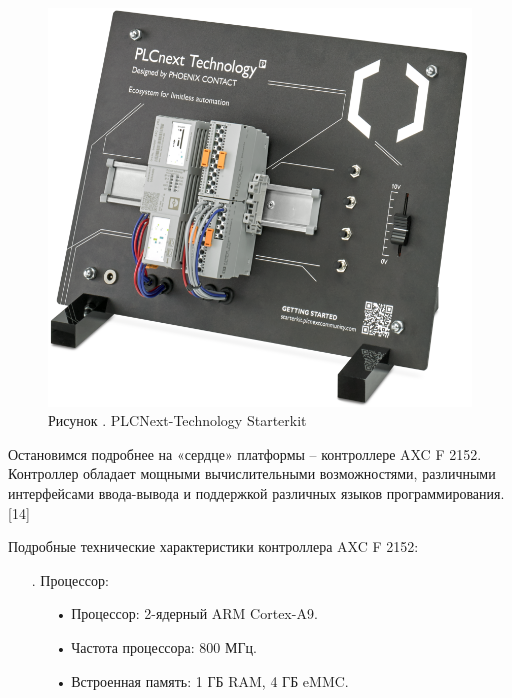 {	\begin{figure}[H]
		\centering
		\def\svgwidth{\textwidth}
		\includegraphics[scale=0.7]{images/pclnext_x.png}
		\caption*{\gostFont Рисунок \thechaptercntr .\theimagecntr \spc {--} PLCNext-Technology Starterkit}
		\label{fig:ACXF2152}
	\end{figure}  \addtocounter{imagecntr}{1}

	\par \redline Остановимся подробнее на «сердце» платформы {--} контроллере AXC F 2152. Контроллер обладает мощными вычислительными возможностями, различными интерфейсами ввода-вывода и поддержкой различных языков программирования.[14]

	\par \redline Подробные технические характеристики контроллера AXC F 2152:

	\begin{itemize}[leftmargin=2.15cm, labelwidth=0.65cm, labelsep=0.0cm] 

		\item[\theitemcntr. ] Процессор:
			\begin{itemize}[leftmargin=1.5cm, labelwidth=0.65cm, labelsep=0.0cm] 
				\item[•] Процессор: 2-ядерный ARM Cortex-A9.
				\item[•] Частота процессора: 800 МГц.
				\item[•] Встроенная память: 1 ГБ RAM, 4 ГБ eMMC.
			\end{itemize} \addtocounter{itemcntr}{1}


\end{itemize}}
